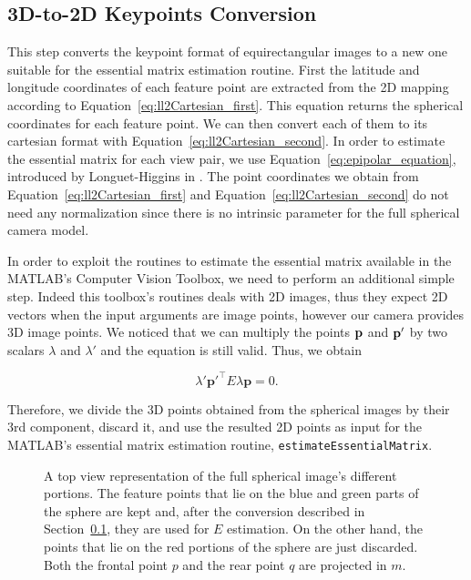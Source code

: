 \subsection{3D-to-2D Keypoints Conversion}
\label{sec:keypoints_conversion}
This step converts the keypoint format of equirectangular images to a new one 
suitable for the essential matrix estimation routine.
First the latitude and longitude coordinates of each feature point are 
extracted from the 2D mapping according to  
Equation~\ref{eq:ll2Cartesian_first}.
This equation returns the spherical coordinates for each feature point. 
We can then convert each of them to its cartesian format with 
Equation~\ref{eq:ll2Cartesian_second}. In order to estimate the essential 
matrix for each view pair, we use Equation~\ref{eq:epipolar_equation}, 
introduced by Longuet-Higgins in \cite{longuet1981computer}.
The point coordinates we obtain from Equation~\ref{eq:ll2Cartesian_first} and
Equation~\ref{eq:ll2Cartesian_second} do not need any normalization since there
is no intrinsic parameter for the full spherical camera model.

In order to exploit the routines to estimate the essential matrix available 
in the MATLAB's Computer Vision Toolbox, we need to perform an additional simple 
step.
Indeed this toolbox's routines deals with 2D images, thus they expect 
2D vectors when the input arguments are image points, however our camera
provides 3D image points.
We noticed that we can multiply the points $\mathbf{p}$
and $\mathbf{p}'$ by two 
scalars ${\lambda}$ and 
${\lambda}'$ and the equation is still valid. Thus, we obtain

\begin{equation*}
\lambda'\mathbf{p}'^\top E\lambda\mathbf{p} = 0 \text{.}
\end{equation*}

Therefore, we divide the 3D points obtained from the spherical images by their 
3rd component, discard it, and use the resulted 2D points as input for the 
MATLAB's essential matrix estimation routine, {\tt estimateEssentialMatrix}.

\begin{figure}
    \centering
    \def\svgwidth{0.8\columnwidth}
    
    \caption{A top view representation of the full spherical image's 
    different portions.
    The feature points that lie on the blue and green parts of the sphere are kept and,
    after the conversion described in Section~\ref{sec:keypoints_conversion},
    they are used for $E$ estimation. On the other hand, the points that lie
    on the red portions of the sphere are just discarded.
    Both the frontal point $p$ and the rear point $q$ are projected in $m$.}
	\label{fig:sphere_division}
\end{figure}


